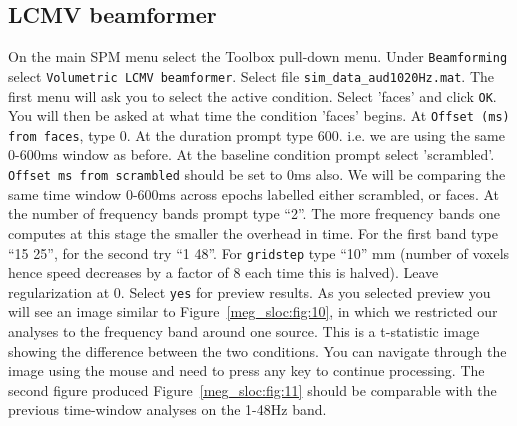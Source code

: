 \subsection{LCMV beamformer}
On the main SPM menu select the Toolbox pull-down menu. Under \texttt{Beamforming} select \texttt{Volumetric LCMV beamformer}.
Select file \texttt{sim\_data\_aud1020Hz.mat}.
The first menu will ask you to select the active condition. Select 'faces' and click \texttt{OK}. You will then be asked at what time the condition 'faces' begins.  At \texttt{Offset (ms) from faces}, type 0. At the duration prompt type 600. i.e. we are using the same 0-600ms window as before. At the baseline condition prompt select 'scrambled'. \texttt{Offset ms from scrambled} should be set to 0ms also. We will be comparing the same time window 0-600ms across epochs labelled either scrambled, or faces. At the number of frequency bands prompt type ``2''. The more frequency bands one computes at this stage the smaller the overhead in time. For the first band type ``15 25'', for the second try ``1 48''. For \texttt{gridstep} type ``10'' mm (number of voxels hence speed decreases by a factor of 8 each time this is halved). Leave regularization at 0. Select \texttt{yes} for preview results.
As you selected preview you will see an image similar to Figure~\ref{meg_sloc:fig:10}, in which we restricted our analyses to the frequency band around one source. This is a t-statistic image showing the difference between the two conditions. You can navigate through the image using the mouse and need to press any key to continue processing. The second figure produced Figure~\ref{meg_sloc:fig:11} should be comparable with the previous time-window analyses on the 1-48Hz band. 

